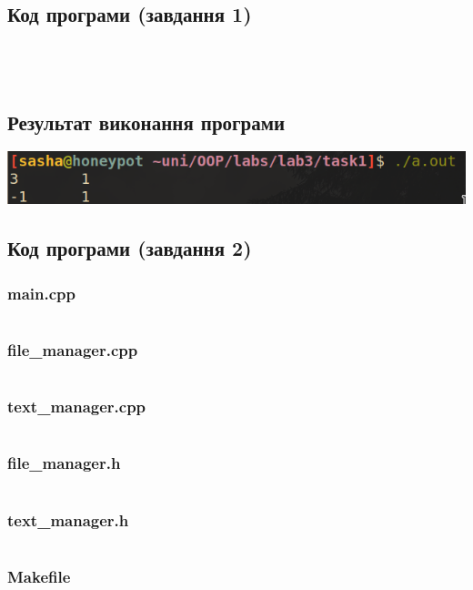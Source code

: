 \documentclass[a4paper, 12pt, oneside]{extarticle}
\begin{document}
\subsection*{Код програми (завдання 1)}

\inputminted{c++}{task1/main.cpp}
\inputminted{c++}{task1/vector.h}
\inputminted{c++}{task1/vector.cpp}
\inputminted{c++}{task1/makefile}

\subsection*{Результат виконання програми}

\includegraphics[width=.7\textwidth]{bruh.png}

\subsection*{Код програми (завдання 2)}

\subsubsection{main.cpp}
\inputminted{c++}{task2/src/main.cpp}
\subsubsection{file_manager.cpp}
\inputminted{c++}{task2/src/file_manager.cpp}
\subsubsection{text_manager.cpp}
\inputminted{c++}{task2/src/text_manager.cpp}
\subsubsection{file_manager.h}
\inputminted{c++}{task2/include/file_manager.h}
\subsubsection{text_manager.h}
\inputminted{c++}{task2/include/text_manager.h}
\subsubsection{Makefile}
\inputminted{make}{task2/src/Makefile}
\end{document}

